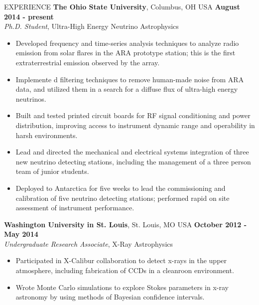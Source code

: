\documentclass{resume} %
\begin{document}
\begin{rSection}{EXPERIENCE}
{\bf The Ohio State University}, Columbus, OH USA \hfill {\bf August 2014 - present} \\
{\em Ph.D. Student}, Ultra-High Energy Neutrino Astrophysics
\begin{itemize}
\vspace*{-.05in}
\item Developed frequency and time-series analysis techniques to analyze radio emission from solar flares in the ARA prototype station; this is the first extraterrestrial emission observed by the array.
\item Implemente d filtering techniques to remove human-made noise from ARA data, and utilized them in a search for a diffuse flux of ultra-high energy neutrinos.
\item Built and tested printed circuit boards for RF signal conditioning and power distribution, improving access to instrument dynamic range and operability in harsh environments.
\item Lead and directed the mechanical and electrical systems integration of three new neutrino detecting stations, including the management of a three person team of junior students.
\item Deployed to Antarctica for five weeks to lead the commissioning and calibration of five neutrino detecting stations; performed rapid on site assessment of instrument performance.
\end{itemize}

{\bf Washington University in St. Louis}, St. Louis, MO USA \hfill {\bf October 2012 - May 2014}\\
{\em Undergraduate Research Associate}, X-Ray Astrophysics
\begin{itemize}
\vspace*{-.05in}
\item Participated in X-Calibur collaboration to detect x-rays in the upper atmosphere, including fabrication of CCDs in a cleanroon environment.
\item Wrote Monte Carlo simulations to explore Stokes parameters in x-ray astronomy by using methods of Bayesian confidence intervals.
\end{itemize}
\end{rSection}

\newpage
\end{document}
